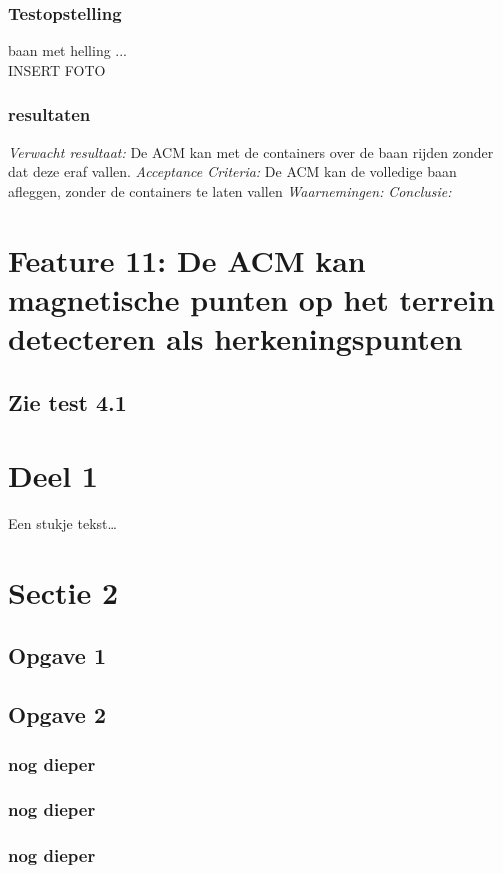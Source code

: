 \documentclass{article}
\begin{document}
\subsubsection{Testopstelling}
baan met helling ... \\
INSERT FOTO
\subsubsection{resultaten}
\textit{Verwacht resultaat: }De ACM kan met de containers over de baan rijden zonder dat deze eraf vallen.
\newline
\textit{Acceptance Criteria: }De ACM kan de volledige baan afleggen, zonder de containers te laten vallen
\newline
\textit{Waarnemingen: }
\newline
\textit{Conclusie: }

\section{Feature 11: De ACM kan magnetische punten op het terrein detecteren als herkeningspunten}
\subsection{Zie test 4.1}



\newpage
\section{Deel 1}
Een stukje tekst\ldots 
\section{Sectie 2}
\subsection{Opgave 1}
\subsection{Opgave 2}
\subsubsection{nog dieper}
\subsubsection{nog dieper}
\subsubsection{nog dieper}
\end{document}
